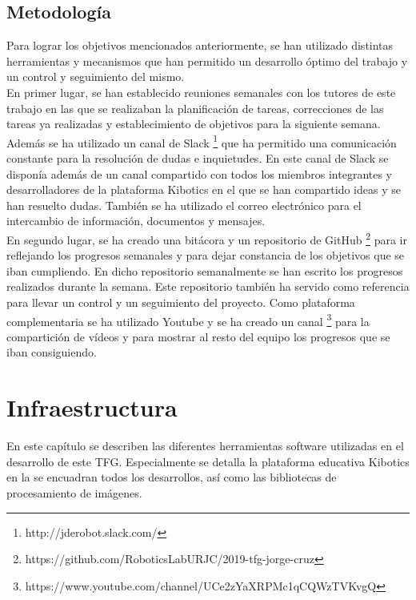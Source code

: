 \documentclass{report}
\begin{document}
\section{Metodología}
Para lograr los objetivos mencionados anteriormente, se han utilizado distintas herramientas y mecanismos que han permitido un desarrollo óptimo del trabajo y un control y seguimiento del mismo. 
\\

En primer lugar, se han establecido reuniones semanales con los tutores de este trabajo en las que se realizaban la planificación de tareas, correcciones de las tareas ya realizadas y establecimiento de objetivos para la siguiente semana. Además se ha utilizado un canal de Slack \footnote{http://jderobot.slack.com/} que ha permitido una comunicación constante para la resolución de dudas e inquietudes. En este canal de Slack se disponía además de un canal compartido con todos los miembros integrantes y desarrolladores de la plataforma Kibotics en el que se han compartido ideas y se han resuelto dudas. También se ha utilizado el correo electrónico para el intercambio de información, documentos y mensajes.
\\

En segundo lugar, se ha creado una bitácora y un repositorio de GitHub \footnote{https://github.com/RoboticsLabURJC/2019-tfg-jorge-cruz} para ir reflejando los progresos semanales y para dejar constancia de los objetivos que se iban cumpliendo. En dicho repositorio semanalmente se han escrito los progresos realizados durante la semana. Este repositorio también ha servido como referencia para llevar un control y un seguimiento del proyecto. Como plataforma complementaria se ha utilizado Youtube y se ha creado un canal \footnote{https://www.youtube.com/channel/UCe2zYaXRPMc1qCQWzTVKvgQ} para la compartición de vídeos y para mostrar al resto del equipo los progresos que se iban consiguiendo.

\chapter{Infraestructura}
En este capítulo se describen las diferentes herramientas software utilizadas en el desarrollo de este TFG. Especialmente se detalla la plataforma educativa Kibotics en la se encuadran todos los desarrollos, así como las bibliotecas de procesamiento de imágenes.
\end{document}
